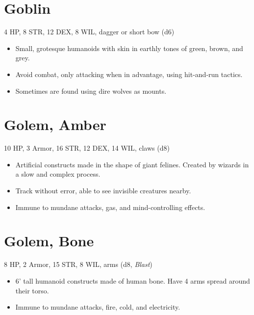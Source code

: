 \documentclass[
  10pt,
  american,
]{article}
\begin{document}
\hypertarget{goblin}{%
\section{Goblin}\label{goblin}}

4 HP, 8 STR, 12 DEX, 8 WIL, dagger or short bow (d6)

\begin{samepage}
\begin{itemize}
\setlength\itemsep{-.5em}
\item Small, grotesque humanoids with skin in earthly tones of green, brown, and grey.
\item Avoid combat, only attacking when in advantage, using hit-and-run tactics.
\item Sometimes are found using dire wolves as mounts.
\end{itemize}
\end{samepage}

\hypertarget{golem-amber}{%
\section{Golem, Amber}\label{golem-amber}}

10 HP, 3 Armor, 16 STR, 12 DEX, 14 WIL, claws (d8)

\begin{samepage}
\begin{itemize}
\setlength\itemsep{-.5em}
\item Artificial constructs made in the shape of giant felines. Created by wizards in a slow and complex process.
\item Track without error, able to see invisible creatures nearby.
\item Immune to mundane attacks, gas, and mind-controlling effects.
\end{itemize}
\end{samepage}

\hypertarget{golem-bone}{%
\section{Golem, Bone}\label{golem-bone}}

8 HP, 2 Armor, 15 STR, 8 WIL, arms (d8, \emph{Blast})

\begin{samepage}
\begin{itemize}
\setlength\itemsep{-.5em}
\item 6’ tall humanoid constructs made of human bone.   Have 4 arms spread around their torso.
\item Immune to mundane attacks, fire, cold, and electricity.
\end{itemize}
\end{samepage}
\end{document}

